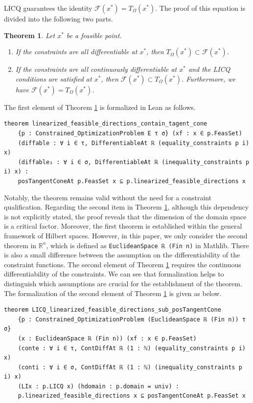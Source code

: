 \documentclass[sn-mathphys]{JORSC-jnl}%
\theoremstyle{thmstyleone}%
\newtheorem{theorem}{Theorem}%
\theoremstyle{thmstylethree}%
\newcommand{\lean}[1]{\lstinline[language=lean, mathescape=true]{#1}}
\begin{document}
LICQ guarantees the identity $\mathcal{F}(x^\ast) = T_\Omega(x^\ast)$. The proof of this equation is divided into the following two parts.
\begin{theorem}\label{thm: LICQ}
    Let $x^\ast$ be a feasible point. %
    \begin{enumerate}
        \item If the constraints are all differentiable at $x^\ast$, then $T_\Omega(x^\ast) \subset \mathcal{F}(x^\ast)$.
        \item If the constraints are all continuously differentiable at $x^\ast$ and the LICQ conditions are satisfied at $x^\ast$, then $\mathcal{F}(x^\ast) \subset T_\Omega(x^\ast)$. Furthermore, we have $\mathcal{F}(x^\ast) = T_\Omega(x^\ast)$.
    \end{enumerate}
\end{theorem}
The first element of Theorem \ref{thm: LICQ} is formalized in Lean as follows. 
\begin{lstlisting}
theorem linearized_feasible_directions_contain_tagent_cone
    {p : Constrained_OptimizationProblem E τ σ} (xf : x ∈ p.FeasSet)
    (diffable : ∀ i ∈ τ, DifferentiableAt ℝ (equality_constraints p i) x)
    (diffable₂ : ∀ i ∈ σ, DifferentiableAt ℝ (inequality_constraints p i) x) : 
    posTangentConeAt p.FeasSet x ⊆ p.linearized_feasible_directions x
\end{lstlisting}
Notably, the theorem remains valid without the need for a constraint qualification. Regarding the second item in Theorem \ref{thm: LICQ}, although this dependency is not explicitly stated, the proof reveals that the dimension of the domain space is a critical factor. Moreover, the first theorem is established within the general framework of Hilbert spaces. However, in this paper, we only consider the second theorem in $\mathbb{R}^n$, which is defined as \lean{EuclideanSpace ℝ (Fin n)} in Mathlib. There is also a small difference between the assumption on the differentiability of the constraint functions. The second element of Theorem \ref{thm: LICQ} requires the continuous differentiability of the constraints. We can see that formalization helps to distinguish which assumptions are crucial for the establishment of the theorem. The formalization of the second element of Theorem \ref{thm: LICQ} is given as below.
\begin{lstlisting}
theorem LICQ_linearized_feasible_directions_sub_posTangentCone
    {p : Constrained_OptimizationProblem (EuclideanSpace ℝ (Fin n)) τ σ}
    (x : EuclideanSpace ℝ (Fin n)) (xf : x ∈ p.FeasSet) 
    (conte : ∀ i ∈ τ, ContDiffAt ℝ (1 : ℕ) (equality_constraints p i) x)
    (conti : ∀ i ∈ σ, ContDiffAt ℝ (1 : ℕ) (inequality_constraints p i) x)
    (LIx : p.LICQ x) (hdomain : p.domain = univ) :
    p.linearized_feasible_directions x ⊆ posTangentConeAt p.FeasSet x
\end{lstlisting}
\end{document}
